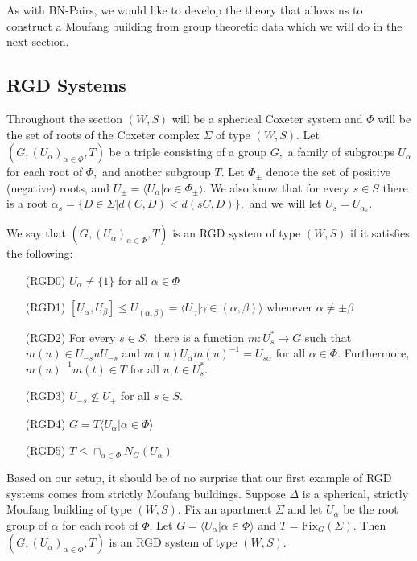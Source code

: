 \documentclass[class=book, crop=false,12 pt]{standalone}
\begin{document}
As with BN-Pairs, we would like to develop the theory that allows us to construct a Moufang building from group theoretic data which we will do in the next section.

\subsection{RGD Systems}
Throughout the section $(W,S)$ will be a spherical Coxeter system and $\Phi$ will be the set of roots of the Coxeter complex $\Sigma$ of type $(W,S).$ Let $(G,(U_\alpha)_{\alpha\in \Phi},T)$ be a triple consisting of a group $G,$ a family of subgroups $U_\alpha$ for each root of $\Phi,$ and another subgroup $T.$ Let $\Phi_{\pm}$ denote the set of positive (negative) roots, and $U_{\pm}=\langle U_\alpha|\alpha\in \Phi_{\pm}\rangle.$ We also know that for every $s\in S$ there is a root $\alpha_s=\{D\in \Sigma|d(C,D)<d(sC,D)\},$ and we will let $U_s=U_{\alpha_s}.$ 

We say that $(G,(U_{\alpha})_{\alpha\in \Phi},T)$ is an RGD system of type $(W,S)$ if it satisfies the following:
\begin{itemize}
\setlength{\itemindent}{0.3 in}
	\item[(RGD0)] $U_\alpha\neq \{1\}$ for all $\alpha\in \Phi$
	\item[(RGD1)] $[U_\alpha,U_\beta]\le U_{(\alpha,\beta)}=\langle U_\gamma|\gamma\in (\alpha,\beta)\rangle$ whenever $\alpha\neq \pm \beta$
	\item[(RGD2)] For every $s\in S,$ there is a function $m:U_s^*\to G$ such that $m(u)\in U_{-s}uU_{-s}$ and $m(u)U_\alpha m(u)^{-1}=U_{s\alpha}$ for all $\alpha\in \Phi.$ Furthermore, $m(u)^{-1}m(t)\in T$ for all $u,t\in U_s^*.$
	\item[(RGD3)] $U_{-s}\not\le U_+$ for all $s\in S.$
	\item[(RGD4)] $G=T\langle U_\alpha|\alpha\in \Phi\rangle$
	\item[(RGD5)] $T\le \cap_{\alpha\in \Phi}N_G(U_\alpha)$
	\end{itemize}

Based on our setup, it should be of no surprise that our first example of RGD systems comes from strictly Moufang buildings. Suppose $\Delta$ is a spherical, strictly Moufang building of type $(W,S).$ Fix an apartment $\Sigma$ and let $U_\alpha$ be the root group of $\alpha$ for each root of $\Phi.$ Let $G=\langle U_\alpha|\alpha\in \Phi\rangle$ and $T=\mathrm{Fix}_G(\Sigma).$ Then $(G,(U_\alpha)_{\alpha\in \Phi},T)$ is an RGD system of type $(W,S).$ 
\end{document}
